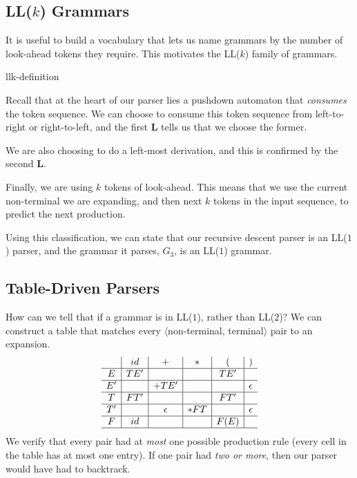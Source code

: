 \subsection{LL($k$) Grammars}\label{section:llk-grammar}
It is useful to build a vocabulary that lets us name grammars by the number of look-ahead tokens they require. This motivates the LL($k$) family of grammars. 



\begin{center}
    {llk-definition}
\end{center}

Recall that at the heart of our parser lies a pushdown automaton that \textit{consumes} the token sequence. We can choose to consume this token sequence from left-to-right or right-to-left, and the first \textbf{L} tells us that we choose the former.

We are also choosing to do a left-most derivation, and this is confirmed by the second \textbf{L}.

Finally, we are using $k$ tokens of look-ahead. This means that we use the current non-terminal we are expanding, and then next $k$ tokens in the input sequence, to predict the next production.

Using this classification, we can state that our recursive descent parser is an LL($1$) parser, and the grammar it parses, $G_3$, is an LL($1$) grammar.

\subsection{Table-Driven Parsers}\label{section:table-driven-parsers}
How can we tell that if a grammar is in LL($1$), rather than LL($2$)? We can construct a table that matches every $\langle$non-terminal, terminal$\rangle$ pair to an expansion.
\[
\begin{array}{c|c|c|c|c|c}
   & id  & +        & *   & (     & )        \\\hline
E  & TE' &          &     & TE'   &          \\\hline
E' &     & +TE'     &     &       & \epsilon \\\hline
T  & FT' &          &     & FT'   &          \\\hline
T' &     & \epsilon & *FT &       & \epsilon \\\hline
F  & id  &          &     & F (E) &          \\\hline
\end{array}
\]
We verify that every pair had at \textit{most} one possible production rule (every cell in the table has at most one entry). If one pair had \textit{two or more}, then our parser would have had to backtrack.

